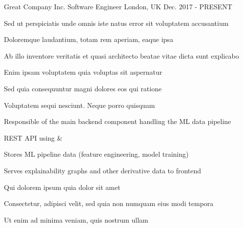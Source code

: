 


\begin{cventries}


\cventry
{Great Company Inc.} %
{Software Engineer} %
{London, UK} %
{Dec. 2017 - PRESENT} %
{
\begin{cvitems}
\setlength{\itemsep}{1ex} %
%
\item {Sed ut perspiciatis unde omnis iste natus error sit voluptatem accusantium}
    \begin{cvitemsnested}
    \item {Doloremque laudantium, totam rem aperiam, eaque ipsa}
    \item {Ab illo inventore veritatis et quasi architecto beatae vitae dicta sunt explicabo}
    \end{cvitemsnested}
%
\item {Enim ipsam voluptatem quia voluptas sit aspernatur}
    \begin{cvitemsnested}
    \item {Sed quia consequuntur magni dolores eos qui ratione}
    \item {Voluptatem sequi nesciunt. Neque porro quisquam}
    \end{cvitemsnested}
%
\item {Responsible of the main backend component handling the ML data pipeline}
    \begin{cvitemsnested}
    \item {REST API using  \& }
    \item {Stores ML pipeline data (feature engineering, model training)}
    \item {Serves explainability graphs and other derivative data to frontend}
    \end{cvitemsnested}
%
\item {Qui dolorem ipsum quia dolor sit amet}
    \begin{cvitemsnested}
    \item {Consectetur, adipisci velit, sed quia non numquam eius modi tempora}
    \item {Ut enim ad minima veniam, quis nostrum ullam}
    \end{cvitemsnested}
%
\end{cvitems}
}


\end{cventries}
